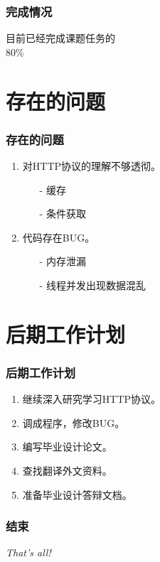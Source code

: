 \documentclass[dvipdfm]{beamer}
\begin{document}
\begin{frame}
	\begin{center}
		\frametitle{完成情况}
		\pause
		\LARGE{目前已经完成课题任务的}\\
		{\Huge  80\% }
		\\
	\end{center}
\end{frame}

\section{存在的问题}
\begin{frame}
	\frametitle{存在的问题}
	\begin{enumerate}
		\item 对{\cp HTTP}协议的理解不够透彻。
		\begin{itemize}
			\item[-] 缓存
			\item[-] 条件获取
		\end{itemize}
		\pause
		\item 代码存在{\cp BUG}。
		\begin{itemize}
			\item[-] 内存泄漏
			\item[-] 线程并发出现数据混乱
		\end{itemize}
	\end{enumerate}
\end{frame}

\section{后期工作计划}
\begin{frame}
	\frametitle{后期工作计划}
	\begin{enumerate}
		\item 继续深入研究学习{\cp HTTP}协议。
		\item 调成程序，修改{\cp BUG}。
		\item 编写毕业设计论文。
		\item 查找翻译外文资料。
		\item 准备毕业设计答辩文档。
	\end{enumerate}
\end{frame}

\begin{frame}
	\frametitle{结束}
	\begin{center}
	{\Huge
		\textsl{{\cp That's all!}}
	}
	\end{center}
\end{frame}
\end{document}
